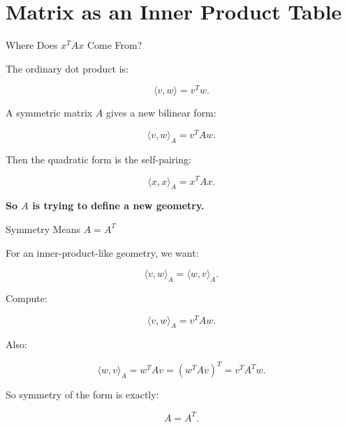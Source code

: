 \documentclass[10pt]{beamer}
\theoremstyle{definition}
\newcommand{\x}[1]{\alert{\textbf{#1}}}
\begin{document}
\section{Matrix as an Inner Product Table}

\begin{frame}{Where Does $x^TAx$ Come From?}

The ordinary dot product is:

$$
\langle v,w\rangle=v^Tw.
$$

\vfill

A symmetric matrix $A$ gives a new bilinear form:

$$
\boxed{\langle v,w\rangle_A=v^TAw.}
$$

\vfill

Then the quadratic form is the self-pairing:

$$
\boxed{\langle x,x\rangle_A=x^TAx.}
$$

\vfill

\begin{center}
\x{So $A$ is trying to define a new geometry.}
\end{center}

\end{frame}


\begin{frame}{Symmetry Means $A=A^T$}

For an inner-product-like geometry, we want:

$$
\langle v,w\rangle_A=\langle w,v\rangle_A.
$$

\vfill

Compute:

$$
\langle v,w\rangle_A=v^TAw.
$$

\vfill

Also:

$$
\langle w,v\rangle_A=w^TAv=(w^TAv)^T=v^TA^Tw.
$$

\vfill

So symmetry of the form is exactly:

$$
\boxed{A=A^T.}
$$

\end{frame}
\end{document}
